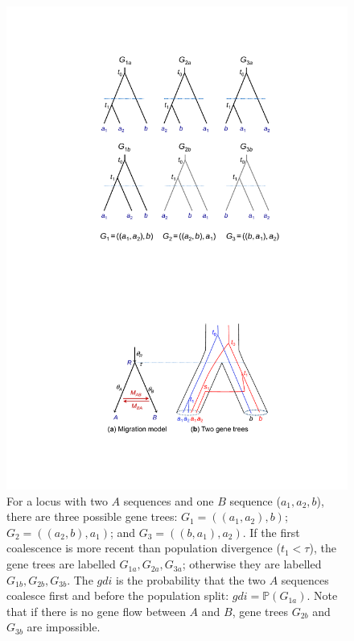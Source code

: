 \documentclass{article1}
\renewcommand{\P}{\mathbb{P}}
\begin{document}
\begin{figure} [t]
   \centering %
   \includegraphics[scale=0.6]{figs/fig-gdi-trees} %
   
   \caption{For a locus with two $A$ sequences and one $B$ sequence ($a_1, a_2, b$), there
   are three possible gene trees: $G_1 = ((a_1, a_2), b)$; $G_2 = ((a_2, b), a_1)$; and
   $G_3 = ((b, a_1), a_2)$.  If the first coalescence is more recent than population
   divergence ($t_1 < \tau$), the gene trees are labelled $G_{1a}, G_{2a}, G_{3a}$;
   otherwise they are labelled $G_{1b}, G_{2b}, G_{3b}$.  The $gdi$ is the
   probability that the two $A$ sequences coalesce first and before the population split:
   $gdi = \P(G_{1a})$.  Note that if there is no gene flow between $A$ and $B$, gene trees
   $G_{2b}$ and $G_{3b}$ are impossible.  %
   } \label{fig:gdi-trees}
\end{figure}
\end{document}
